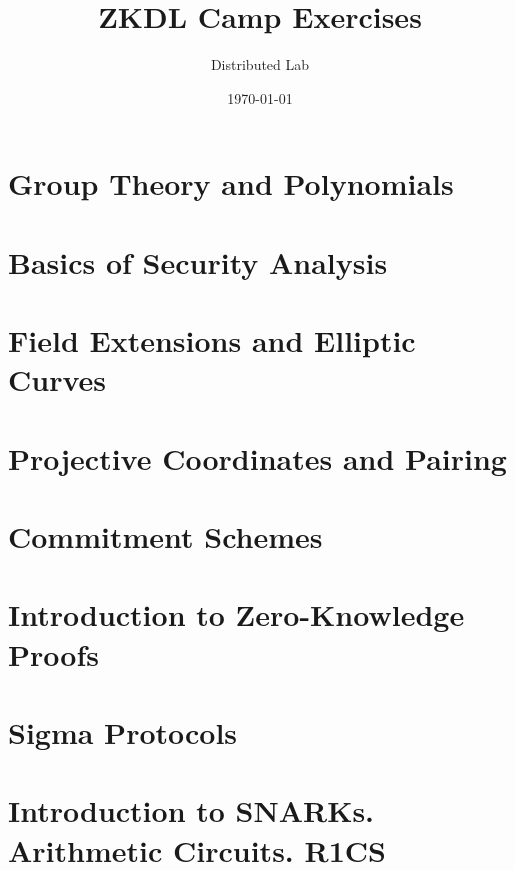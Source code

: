 \documentclass{zkdl-template}
\title{\huge\sffamily\bfseries ZKDL Camp Exercises}
\author{\Large\sffamily Distributed Lab}
\date{\sffamily \today}
\begin{document}
\pagestyle{fancy}

\maketitle

\pagebreak

\tableofcontents

\pagebreak

\section{Group Theory and Polynomials}



\section{Basics of Security Analysis}\label{section:math-crypto-2}



\section{Field Extensions and Elliptic Curves}



\section{Projective Coordinates and Pairing}



\section{Commitment Schemes}



\section{Introduction to Zero-Knowledge Proofs}



\section{Sigma Protocols}



\section{Introduction to SNARKs. Arithmetic Circuits. R1CS}


\end{document}
